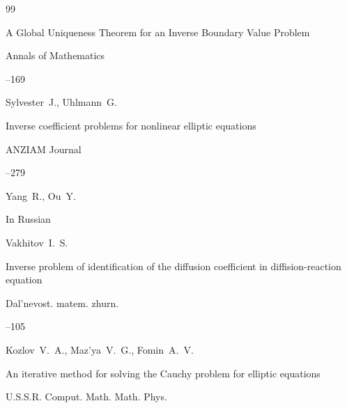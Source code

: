 \begin{thebibliography}{99}







\paper A Global Uniqueness Theorem for an Inverse Boundary Value Problem

\jour Annals of Mathematics 



--169

\by Sylvester~J., Uhlmann~G.





\paper Inverse coefficient problems for nonlinear elliptic equations

\jour ANZIAM Journal 




--279

\by Yang~R., Ou~Y.








\lang In Russian

\by Vakhitov~I.~S.

\paper Inverse problem of identification of the diffusion coefficient in diffision-reaction equation

\jour Dal'nevost. matem. zhurn.




--105








\by Kozlov~V.~A., Maz'ya~V.~G., Fomin~A.~V.

\paper An iterative method for solving the Cauchy problem for elliptic equations

\jour U.S.S.R. Comput. Math. Math. Phys.


\end{thebibliography}
